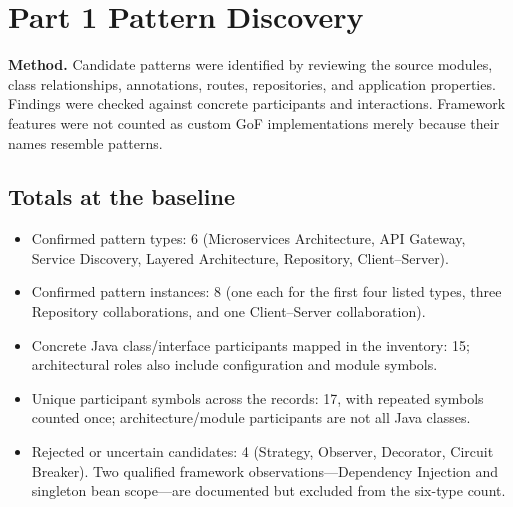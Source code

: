 \documentclass[11pt,a4paper]{article}
\begin{document}
\section{Part 1 Pattern Discovery}
\textbf{Method.} Candidate patterns were identified by reviewing the source modules, class relationships, annotations, routes, repositories, and application properties. Findings were checked against concrete participants and interactions. Framework features were not counted as custom GoF implementations merely because their names resemble patterns.

\subsection{Totals at the baseline}
\begin{itemize}
\item Confirmed pattern types: 6 (Microservices Architecture, API Gateway, Service Discovery, Layered Architecture, Repository, Client--Server).
\item Confirmed pattern instances: 8 (one each for the first four listed types, three Repository collaborations, and one Client--Server collaboration).
\item Concrete Java class/interface participants mapped in the inventory: 15; architectural roles also include configuration and module symbols.
\item Unique participant symbols across the records: 17, with repeated symbols counted once; architecture/module participants are not all Java classes.
\item Rejected or uncertain candidates: 4 (Strategy, Observer, Decorator, Circuit Breaker). Two qualified framework observations—Dependency Injection and singleton bean scope—are documented but excluded from the six-type count.
\end{itemize}
\end{document}
